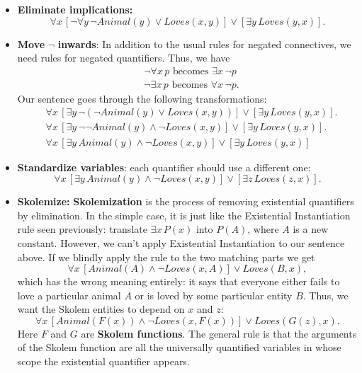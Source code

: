 \begin{itemize}
    \item \textbf{Eliminate implications:}
    \[\forall x \, [\neg \forall y \, \neg Animal(y) \lor Loves(x, y)] \lor [\exists y \, Loves(y, x)] .\]

    \item \textbf{Move} $\neg$ \textbf{inwards}: In addition to the usual rules for negated connectives, we need rules for negated quantifiers. Thus, we have
    \[\begin{split}
        & \neg \forall x \, p \,\, \text{becomes} \,\, \exists x \, \neg p\\
        & \neg \exists x \, p \,\, \text{becomes} \,\, \forall x \, \neg p .
    \end{split}\]
    Our sentence goes through the following transformations:
    \[\begin{split}
        & \forall x \, [\exists y \, \neg(\neg Animal(y) \lor Loves(x, y))] \lor [\exists y \, Loves(y, x)].\\
        & \forall x \,[\exists y \, \neg \neg Animal(y) \land \neg Loves(x, y)] \lor [\exists y \, Loves(y, x)].\\
        & \forall x \,[\exists y \, Animal(y) \land \neg Loves(x, y)] \lor [\exists y \, Loves(y, x)]
    \end{split}
    \]

    \item \textbf{Standardize variables}: each quantifier should use a different one:
    \[\forall x \,[\exists y \, Animal(y) \land \neg Loves(x, y)] \lor [\exists z \, Loves(z, x)] .\]

    \item \textbf{Skolemize:} \textbf{Skolemization} is the process of removing existential quantifiers by elimination. In the simple case, it is just like the Existential Instantiation rule seen previously: translate $\exists x \, P(x)$ into $P(A)$, where $A$ is a new constant. However, we can’t apply Existential Instantiation to our sentence above. If we blindly apply the rule to the two matching parts we get
    \[\forall x \, [Animal(A) \land \neg Loves(x, A)] \lor Loves(B,x),\]
    which has the wrong meaning entirely: it says that everyone either fails to love a particular animal $A$ or is loved by some particular entity $B$. Thus, we want the Skolem entities to depend on $x$ and $z$:
    \[\forall x \, [Animal(F(x)) \land \neg Loves(x, F(x))] \lor Loves(G(z), x) .\]
    Here $F$ and $G$ are \textbf{Skolem functions}.  The general rule is that the arguments of the Skolem function are all the universally quantified variables in whose scope the existential quantifier appears.


\end{itemize}
